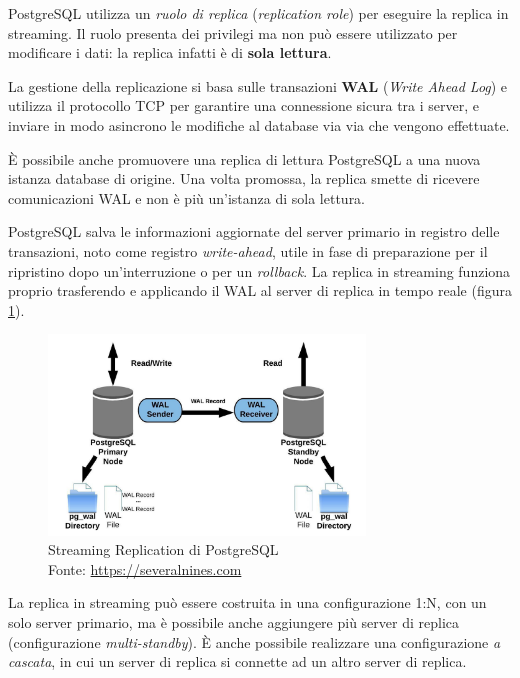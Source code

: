 PostgreSQL utilizza un \textit{ruolo di replica} (\textit{replication role}) per eseguire la replica in streaming. Il ruolo presenta dei privilegi ma non può essere utilizzato per modificare i dati: la replica infatti è di \textbf{sola lettura}.

La gestione della replicazione si basa sulle transazioni \textbf{WAL} (\textit{Write Ahead Log}) e utilizza il protocollo TCP per garantire una connessione sicura tra i server, e inviare in modo asincrono le modifiche al database via via che vengono effettuate.

È possibile anche promuovere una replica di lettura PostgreSQL a una nuova istanza database di origine. Una volta promossa, la replica smette di ricevere comunicazioni WAL e non è più un'istanza di sola lettura.

PostgreSQL salva le informazioni aggiornate del server primario in registro delle transazioni, noto come registro \textit{write-ahead}, utile in fase di preparazione per il ripristino dopo un'interruzione o per un \textit{rollback}. La replica in streaming funziona proprio trasferendo e applicando il WAL al server di replica in tempo reale (figura \ref{fig:streaming-replication}).

\begin{figure}[H]
\centering
\captionsetup{justification=centering}
\includegraphics[width=0.75\textwidth,height=\textheight,keepaspectratio]{img/streaming_replication.jpg}
\caption{Streaming Replication di PostgreSQL\\Fonte: \url{https://severalnines.com}}
\label{fig:streaming-replication}
\end{figure}

La replica in streaming può essere costruita in una configurazione 1:N, con un solo server primario, ma è possibile anche aggiungere più server di replica (configurazione \textit{multi-standby}). È anche possibile realizzare una configurazione \textit{a cascata}, in cui un server di replica si connette ad un altro server di replica.

